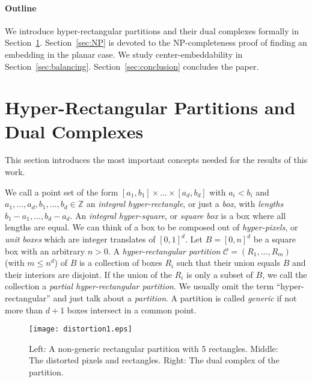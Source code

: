 \documentclass[12pt]{article}
\newcommand{\Z}{\mathbb{Z}}
\newcommand{\partition}{\mathcal{C}}
\begin{document}
\paragraph{Outline}
We introduce hyper-rectangular partitions and their dual complexes formally in Section~\ref{sec:definitions}.
Section~\ref{sec:NP} is devoted to the NP-completeness proof of finding an embedding in the planar case.
We study center-embeddability in Section~\ref{sec:balancing}. Section~\ref{sec:conclusion} concludes
the paper.

\section{Hyper-Rectangular Partitions and Dual Complexes}
\label{sec:definitions}

This section introduces the most important concepts needed for the results
of this work. 

We call a point set of the form $[a_1,b_1]\times\ldots\times [a_d,b_d]$
with $a_i<b_i$ and $a_1,\ldots,a_d,b_1,\ldots,b_d\in\Z$ an \emph{integral hyper-rectangle},
or just a \emph{box}, with \emph{lengths} $b_1-a_1,\ldots,b_d-a_d$.
An \emph{integral hyper-square}, or \emph{square box} 
is a box where all lengths are equal.
We can think of a box to be composed out of \emph{hyper-pixels}, 
or \emph{unit boxes} which are integer translates of $[0,1]^d$.
Let $B=[0,n]^d$ be a square box with an arbitrary $n>0$.
A \emph{hyper-rectangular partition} $\partition=(R_1,\ldots,R_m)$ (with $m\leq n^d$) 
of $B$ is a collection of boxes $R_i$ such that their union equals $B$ and 
their interiors are disjoint. If the union of the $R_i$ is only a subset of $B$, 
we call the collection a \emph{partial hyper-rectangular partition}. 
We usually omit the term ``hyper-rectangular'' and just talk about a \emph{partition}.
A partition is called \emph{generic} if not more than $d+1$ boxes 
intersect in a common point.

\begin{figure}
\begin{center}
\texttt{[image: distortion1.eps]}
\end{center}
\caption{Left: A non-generic rectangular partition with 5 rectangles. Middle: 
The distorted pixels and rectangles. Right: The dual complex of the partition.}
\label{fig:distortion}
\end{figure}
\end{document}
